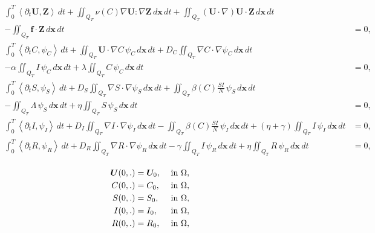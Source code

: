 \documentclass[10pt,a4paper]{amsart}
\begin{document}
		\begin{eqnarray}\label{eqvar1}
			\begin{split}
				\int_{0}^{T}		\left\langle\partial_t\boldsymbol{U}, \boldsymbol{Z}\right\rangle\, dt+\iint_{Q_T}	\nu(C) \nabla \boldsymbol{U} : \nabla \boldsymbol{Z}\, d\mathbf{x}\, dt+\iint_{Q_T}	(\boldsymbol{U}\cdot\nabla)\boldsymbol{U} \cdot  \boldsymbol{Z}\, d\mathbf{x}\, dt\\
				-\iint_{Q_T}\boldsymbol{f}\cdot \boldsymbol{Z}\, d\mathbf{x}\, dt&=0,
				\\  
				\int_{0}^{T}	\left\langle\partial_tC, \psi_C \right\rangle\, dt+ \iint_{Q_T}  \boldsymbol{U}\cdot\nabla C\, \psi_C\, d\mathbf{x}\, dt+ D_C\iint_{Q_T}\nabla C \cdot\nabla \psi_C\, d\mathbf{x}\, dt\\ - \alpha\iint_{Q_T} I\, \psi_C\, d\mathbf{x}\, dt + \lambda \iint_{Q_T} C \,\psi_C \, d\mathbf{x}\, dt
				&=0,
				\\ 	  		
				\int_{0}^{T}	\left\langle\partial_t S, \psi_S \right\rangle\, dt+ D_S\iint_{Q_T}\nabla S \cdot\nabla \psi_S\, d\mathbf{x}\, dt+\iint_{Q_T}\beta(C) \frac{SI}{N} \, \psi_S\, d\mathbf{x}\, dt\\-\iint_{Q_T} \Lambda \,\psi_S \, d\mathbf{x}\, dt + \eta \iint_{Q_T} S \,\psi_S \, d\mathbf{x}\, dt
				&=0,
				\\ 	  		
				\int_{0}^{T}	\left\langle\partial_t I, \psi_I \right\rangle\,  dt+ D_I\iint_{Q_T}\nabla I \cdot\nabla \psi_I\, d\mathbf{x}\, dt-\iint_{Q_T}\beta(C) \frac{SI}{N} \, \psi_I\, d\mathbf{x}\, dt + (\eta+\gamma) \iint_{Q_T} I \,\psi_I \, d\mathbf{x}\, dt
				&=0,
				\\ 	  		
			\int_{0}^{T}	\left\langle\partial_t R, \psi_R \right\rangle\,  dt+ D_R\iint_{Q_T}\nabla R \cdot\nabla \psi_R\, d\mathbf{x}\, dt-\gamma\iint_{Q_T} I \,\psi_R \, d\mathbf{x}\, dt+ \eta\iint_{Q_T} R \,\psi_R \, d\mathbf{x}\, dt
				&=0,
			\end{split} 
		\end{eqnarray}   

		\begin{eqnarray}\label{eqvar2}
			\begin{split}
				\boldsymbol{U}(0,\mathbf{.}) &=\boldsymbol{U}_{0},  & \hbox { in }   \Omega, \\
				C(0,\mathbf{.}) &=C_{0},  & \hbox { in }   \Omega,
				\\
				S(0,\mathbf{.}) &=S_{0},  & \hbox { in }   \Omega, \\
				I(0,\mathbf{.}) &=I_{0},  & \hbox { in }   \Omega, \\
				R(0,\mathbf{.}) &=R_{0},  & \hbox { in }   \Omega,  
			\end{split}
		\end{eqnarray}
\end{document}
